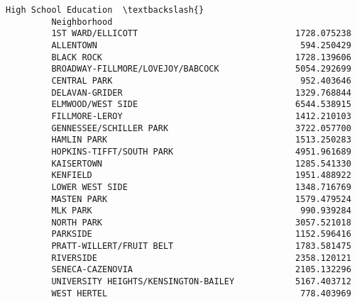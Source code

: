 \documentclass[11pt]{article}
\begin{document}
\begin{Verbatim}[commandchars=\\\{\}]
                                               High School Education  \textbackslash{}
         Neighborhood                                                  
         1ST WARD/ELLICOTT                               1728.075238   
         ALLENTOWN                                        594.250429   
         BLACK ROCK                                      1728.139606   
         BROADWAY-FILLMORE/LOVEJOY/BABCOCK               5054.292699   
         CENTRAL PARK                                     952.403646   
         DELAVAN-GRIDER                                  1329.768844   
         ELMWOOD/WEST SIDE                               6544.538915   
         FILLMORE-LEROY                                  1412.210103   
         GENNESSEE/SCHILLER PARK                         3722.057700   
         HAMLIN PARK                                     1513.250283   
         HOPKINS-TIFFT/SOUTH PARK                        4951.961689   
         KAISERTOWN                                      1285.541330   
         KENFIELD                                        1951.488922   
         LOWER WEST SIDE                                 1348.716769   
         MASTEN PARK                                     1579.479524   
         MLK PARK                                         990.939284   
         NORTH PARK                                      3057.521018   
         PARKSIDE                                        1152.596416   
         PRATT-WILLERT/FRUIT BELT                        1783.581475   
         RIVERSIDE                                       2358.120121   
         SENECA-CAZENOVIA                                2105.132296   
         UNIVERSITY HEIGHTS/KENSINGTON-BAILEY            5167.403712   
         WEST HERTEL                                      778.403969   
         

\end{Verbatim}
\end{document}
